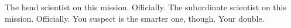\documentclass[char]{guildcamp3}
\begin{document}
\begin{contacts}
  \contact{\cSciOne{}} The head scientist on this mission. Officially. 
  \contact{\cSciTwo{}} The subordinate scientist on this mission. Officially. You suspect \cSciTwo{} is the smarter one, though.
  \contact{\cServant{}} Your double. 
\end{contacts}
\end{document}
